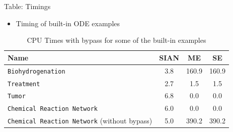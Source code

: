 \documentclass[final,hyperref={pdfpagelabels=false}]{beamer}
\begin{document}
\begin{frame}[t]
\begin{columns}[t]
\begin{column}{.465\textwidth}
\begin{block}{Table: Timings}
                \begin{itemize}
                    \item Timing of built-in ODE examples
                \end{itemize}
                \begin{table}[htbp] %
                    \centering
                    \begin{tabular}{lccc}
                        \hline
                        Name                                             & SIAN & ME    & SE                  \\\hline\hline
                        {\tt Biohydrogenation}                           & 3.8  & 160.9 & 160.9               \\
                        {\tt Treatment}                                  & 2.7  & 1.5   & 1.5                 \\
                        {\tt Tumor}                                      & 6.8  & 0.0   & 0.0                 \\
                        {\tt Chemical Reaction Network}                  & 6.0  & 0.0   & 0.0\footnotemark[8] \\
                        {\tt Chemical Reaction Network} (without bypass) & 5.0  & 390.2 & 390.2               \\
                        \hline
                    \end{tabular}
                    \caption{CPU Times with bypass for some of the built-in examples}
                    \label{tab:def}
                \end{table}

            \end{block}




\end{column}
\end{columns}
\end{frame}
\end{document}
